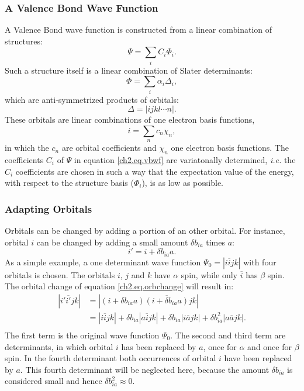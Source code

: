 \subsubsection{A Valence Bond Wave Function}
 
A Valence Bond wave function is constructed from a linear combination of structures:
\begin{equation}
\Psi = \sum_{i} C_i \Phi_i.
\label{ch2.eq.vbwf}
\end{equation}
Such a structure itself is a linear combination of Slater determinants:
\begin{equation}
\Phi = \sum_{i} \alpha_i \Delta_i,
\label{ch2.eq.struct}
\end{equation}
which are anti-symmetrized products of orbitals:
\begin{equation}
\Delta = |ijkl \cdots n|.
\label{ch2.eq.determ}
\end{equation}
These orbitals are linear combinations of one electron basis functions,
\begin{equation}
i = \sum_{n} c_n \chi_n,
\label{ch2.eq.basis}
\end{equation}
in which the $c_n$ are orbital coefficients and $\chi_n$ one electron basis functions. The coefficients $C_i$ of $\Psi$ in equation \ref{ch2.eq.vbwf} are variatonally determined, \textit{i.e.} the $C_i$ coefficients are chosen in such a way that the expectation value of the energy, with respect to the structure basis ($\Phi_i$), is as low as possible.

\subsubsection{Adapting Orbitals}

Orbitals can be changed by adding a portion of an other orbital. For instance, orbital $i$ can be changed by adding a small amount $\delta b_{ia}$ times $a$:
\begin{equation}
i' = i + \delta b_{ia} a.
\label{ch2.eq.orbchange}
\end{equation}
As a simple example, a one determinant wave function $\Psi_0=|i\overline{i}jk|$ with four orbitals is chosen. The orbitals $i$, $j$ and $k$ have $\alpha$ spin, while only $\overline{i}$ has $\beta$ spin. The orbital change of equation \ref{ch2.eq.orbchange} will result in:
\begin{equation}    
\begin{split}
|i'\overline{i'}jk | & = |(i + \delta b_{ia} a)\overline{(i + \delta b_{ia}a)}jk |\\
& = |i\overline{i}jk| + \delta b_{ia}|a\overline{i}jk| + \delta b_{ia} |i\overline{a}jk| + \delta b^2_{ia} |a\overline{a}jk|.\\
\end{split}
\label{ch2.eq.detchange}
\end{equation}
The first term is the original wave function $\Psi_0$. The second and third term are determinants, in which orbital $i$ has been replaced by $a$, once for $\alpha$ and once for $\beta$ spin. In the fourth determinant both occurrences of orbital $i$ have been replaced by $a$. This fourth determinant will be neglected here, because the amount $\delta b_{ia}$ is considered small and hence $\delta b_{ia}^2 \approx 0$.


